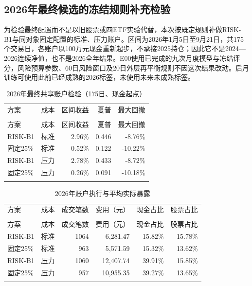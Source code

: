 \documentclass[12pt]{article}
\newcommand{\toprule}{\noalign{\hrule height .8pt}}
\newcommand{\midrule}{\noalign{\hrule height .4pt}}
\newcommand{\bottomrule}{\noalign{\hrule height .8pt}}
\begin{document}
\subsection{2026年最终候选的冻结规则补充检验}
为检验最终配置而不是以旧股票或四ETF实验代替，本次按既定规则补做RISK-B1与同对象固定配置的标准、压力账户。区间为2026年1月5日至9月21日，共175个交易日，各账户以100万元现金重新起步，不承接2025持仓；因此它不是2024—2026连续净值，也不是2026全年结果。E00使用已完成的九次月度模型与冻结评分，风险预算参数、60日风险窗口及20日外层再平衡规则不因这次结果改动。后月训练可使用此前已经成熟的2026标签，未使用未来未成熟标签。
{\small
\begin{longtable}{@{}lrrrr@{}}
\caption{2026年最终共享账户检验（175日、现金起点）}\label{tab:final2026}\\
\toprule
方案 & 成本 & 区间收益 & 夏普 & 最大回撤 \\
\midrule\endfirsthead
\multicolumn{5}{c}{表\thetable（续）}\\\toprule
方案 & 成本 & 区间收益 & 夏普 & 最大回撤 \\
\midrule\endhead
RISK-B1 & 标准 & 2.96\% & 0.446 & -8.76\% \\
固定25\% & 标准 & 0.52\% & 0.122 & -10.22\% \\
RISK-B1 & 压力 & 2.78\% & 0.433 & -8.72\% \\
固定25\% & 压力 & 0.26\% & 0.091 & -10.18\% \\
\bottomrule\end{longtable}}
{\small
\begin{longtable}{@{}lrrrrr@{}}
\caption{2026年账户执行与平均实际暴露}\label{tab:final2026cost}\\
\toprule
方案 & 成本 & 成交笔数 & 费用（元） & 现金占比 & 股票占比 \\
\midrule\endfirsthead
\multicolumn{6}{c}{表\thetable（续）}\\\toprule
方案 & 成本 & 成交笔数 & 费用（元） & 现金占比 & 股票占比 \\
\midrule\endhead
RISK-B1 & 标准 & 1064 & 6,281.47 & 15.82\% & 15.78\% \\
固定25\% & 标准 & 963 & 5,571.59 & 15.32\% & 13.62\% \\
RISK-B1 & 压力 & 1060 & 12,407.74 & 39.91\% & 15.85\% \\
固定25\% & 压力 & 957 & 10,955.35 & 39.27\% & 13.65\% \\
\bottomrule\end{longtable}}
\end{document}

